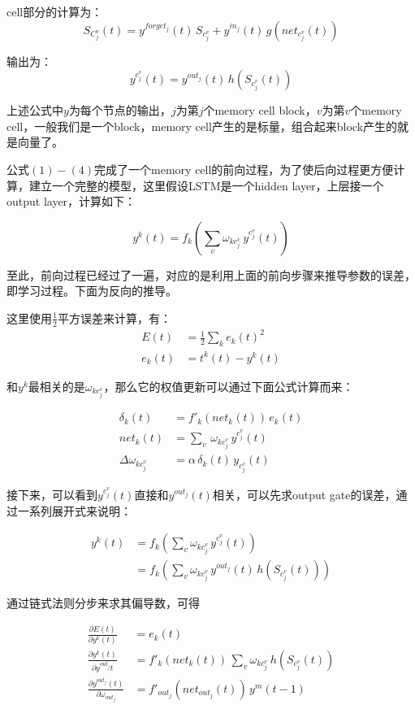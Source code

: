 \documentclass[UTF8]{ctexart}
\begin{document}
cell部分的计算为：
\begin{equation}
S_{C^v_j}(t) = y^{forget_j}(t) \, S_{c^v_j} + y^{in_j}(t) \, g(net_{c^v_j}(t))
\end{equation}

输出为：
\begin{equation}
y^{c^v_j}(t) = y^{out_j}(t) \, h(S_{c^v_j}(t))
\end{equation}

上述公式中$y$为每个节点的输出，$j$为第$j$个memory cell block，$v$为第$v$个memory cell，一般我们是一个block，memory cell产生的是标量，组合起来block产生的就是向量了。

公式$(1)-(4)$完成了一个memory cell的前向过程，为了使后向过程更方便计算，建立一个完整的模型，这里假设LSTM是一个hidden layer，上层接一个output layer，计算如下：

\begin{equation}
y^{k}(t) = f_{k}(\sum_v\omega_{kc^v_j} \, y^{c^v_j}(t))
\end{equation}

至此，前向过程已经过了一遍，对应的是利用上面的前向步骤来推导参数的误差，即学习过程。下面为反向的推导。

这里使用$\frac{1}{2}$平方误差来计算，有：
\begin{align}
E(t) &= \frac{1}{2}\sum_{k}e_k(t)^2 \\
e_k(t) &= t^k(t) - y^k(t)
\end{align}

和$y^k$最相关的是$\omega_{kc^v_j}$，那么它的权值更新可以通过下面公式计算而来：

\begin{align}
\delta_k(t) &= {f'}_{k}(net_k (t)) \, e_k(t) \\
net_k(t) &= \sum_v \, \omega_{kc^v_j} \, y^{c^v_j}(t) \\
\Delta \omega_{kc^v_j} &= \alpha \, \delta_k(t) \, y_{c^v_j}(t)
\end{align}

接下来，可以看到$y^{c^v_j}(t)$直接和$y^{out_j}(t)$相关，可以先求output gate的误差，通过一系列展开式来说明：

\begin{align}
y^{k}(t) &= f_k(\sum_v \omega_{kc^v_j} \, y^{c^v_j}(t)) \\
&= f_k(\sum_v \omega_{kc^v_j} \, y^{out_j}(t) \, h(S_{c^v_j}(t)))
\end{align}

通过链式法则分步来求其偏导数，可得

\begin{align}
\frac{\partial E(t)} {\partial y^k(t)} &= e_k(t) \\
\frac{\partial y^k(t)} {\partial y^{out_j}{t}} &= {f'}_k(net_k(t)) \, \sum_v\omega_{kc^v_j} \, h(S_{c^v_j}(t)) \\
\frac{\partial y^{out_j}(t)} {\partial \omega_{out_j}} &= {f'}_{out_j}(net_{out_j}(t)) \, y^m(t-1) \\
\end{align}
\end{document}
